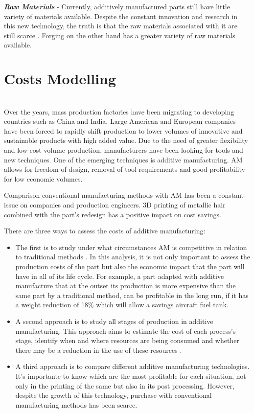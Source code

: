  \noindent
  \textbf{\emph{Raw Materials}} - Currently, additively manufactured parts still have little variety of materials available. Despite the constant innovation and research in this new technology, the truth is that the raw materials associated with it are still scarce \cite{herzog2016additive}. Forging on the other hand has a greater variety of raw materials available.\par
 

\newpage
\section{Costs Modelling}
 
 \vspace{20}\\

Over the years, mass production factories have been migrating to developing countries such as China and India. Large American and European companies have been forced to rapidly shift production to lower volumes of innovative and sustainable products with high added value. Due to the need of greater flexibility and low-cost volume production, manufacturers have been looking for tools and new techniques. One of the emerging techniques is additive manufacturing. AM allows for freedom of design, removal of tool requirements and good profitability for low economic volumes. \cite{mellor2014additive}\par
Comparison conventional manufacturing methods with AM has been a constant issue on companies and production engineers. 3D printing of metallic hair combined with the part's redesign has a positive impact on cost savings. \cite{atzeni2012economics}\par
There are three ways to assess the costs of additive manufacturing:
\begin{itemize}
    \item The first is to study under what circumstances AM is competitive in relation to traditional methods \cite{thomas2014costs}. In this analysis, it is not only important to assess the production costs of the part but also the economic impact that the part will have in all of its life cycle. For example, a part adapted with additive manufacture that at the outset its production is more expensive than the same part by a traditional method, can be profitable in the long run, if it has a weight reduction of 18\% which will allow a savings aircraft fuel tank.  
    \item A second approach is to study all stages of production in additive manufacturing. This approach aims to estimate the cost of each process's stage, identify when and where resources are being consumed and whether there may be a reduction in the use of these resources \cite{thomas2014costs}.
    \item A third approach is to compare different additive manufacturing technologies. It's importante to know which are the most profitable for each situation, not only in the printing of the same but also in its post processing. However, despite the growth of this technology, purchase with conventional manufacturing methods has been scarce.
\end{itemize}




